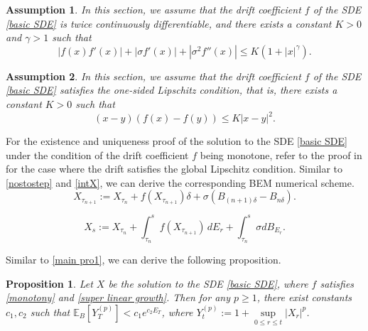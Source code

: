 \documentclass[10pt,reqno,final]{amsart}
\theoremstyle{plain}
\newtheorem{assumption}{Assumption}[section]
\newtheorem{proposition}{Proposition}[section]
\theoremstyle{definition}
\theoremstyle{remark}
\numberwithin{equation}{section}
\numberwithin{figure}{section}
\numberwithin{table}{section}
\begin{document}
\begin{assumption}\label{momentBEM}
	In this section, we assume that the drift coefficient \(f\) of the SDE \cref{basic SDE} is twice continuously differentiable, and there exists a constant \(K > 0\) and \(\gamma > 1\) such that
	\begin{equation}
		|f(x)f'(x)| + |\sigma f'(x)| + |\sigma^2 f''(x)| \leq K(1 + |x|^{\gamma}).
	\end{equation}
\end{assumption}

\begin{assumption}\label{Local Lipschitz}
	In this section, we assume that the drift coefficient $f$ of the SDE \cref{basic SDE} satisfies the one-sided Lipschitz condition, that is, there exists a constant $K > 0$ such that
	\begin{equation}
		(x-y)(f(x)-f(y)) \le K|x-y|^2.
	\end{equation}
\end{assumption}

For the existence and uniqueness proof of the solution to the SDE \cref{basic SDE} under the condition of the drift coefficient \(f\) being monotone, refer to the proof in \cite{umarov2018beyond} for the case where the drift satisfies the global Lipschitz condition. Similar to \textnormal{\cref{nostostep}} and \textnormal{\cref{intX}}, we can derive the corresponding BEM numerical scheme.
\begin{equation}\label{nostostepY}
	X_{\tau_{n+1}} :=X_{\tau_n} + f\left(X_{\tau_{n+1}}\right)\delta + \sigma\left(B_{(n+1)\delta}-B_{n\delta}\right).
\end{equation}

\begin{equation}\label{intY}
	X_s:= X_{\tau_n} + \int_{\tau_n}^s f\left(X_{\tau_{n+1}}\right) \, dE_r + \int_{\tau_n}^s \sigma dB_{E_r}.
\end{equation}

Similar to \cref{main pro1}, we can derive the following proposition.
\begin{proposition}\label{main pro2}
	Let $X$ be the solution to the SDE \cref{basic SDE}, where $f$ satisfies \cref{monotony} and \cref{super linear growth}. Then for any $p \ge 1$, there exist constants $c_1, c_2$ such that $\mathbb{E}_{B}[Y_T^{(p)}] < c_1 e^{c_2E_T }$, where $Y_t^{(p)} := 1 + \sup\limits_{0 \le r \le t} |X_r|^p$.
\end{proposition}
\end{document}
